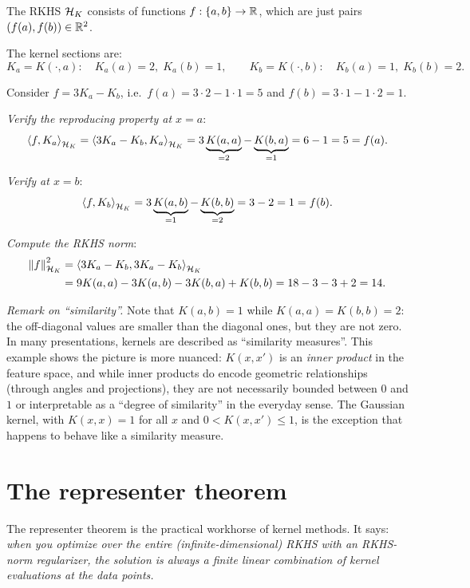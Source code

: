 \begin{notechapter}
\begin{example}
The RKHS $\mathcal{H}_K$ consists of functions $f: \{a,b\} \to \mathbb{R}$, which are just
pairs $(f(a), f(b)) \in \mathbb{R}^2$.

The kernel sections are:
\[
K_a = K(\cdot, a): \quad K_a(a) = 2,\; K_a(b) = 1, \qquad K_b = K(\cdot,
b): \quad K_b(a) = 1,\; K_b(b) = 2.
\]

Consider $f = 3K_a - K_b$, i.e.\ $f(a) = 3 \cdot 2 - 1 \cdot 1 = 5$ and
$f(b) = 3 \cdot 1 - 1 \cdot 2 = 1$.

\emph{Verify the reproducing property at $x = a$}:
\[
\left\langle f, K_a \right\rangle_{\mathcal{H}_K} = \left\langle 3K_a - K_b, K_a \right\rangle_{\mathcal{H}_K} =
3\underbrace{K(a,a)}_{=2} - \underbrace{K(b,a)}_{=1} = 6 - 1 = 5 = f(a).
\]

\emph{Verify at $x = b$}:
\[
\left\langle f, K_b \right\rangle_{\mathcal{H}_K} = 3\underbrace{K(a,b)}_{=1} -
\underbrace{K(b,b)}_{=2} = 3 - 2 = 1 = f(b).
\]

\emph{Compute the RKHS norm}:
\[
\begin{aligned}
\left\|f\right\|_{\mathcal{H}_K}^2 &= \left\langle 3K_a - K_b, 3K_a - K_b \right\rangle_{\mathcal{H}_K}\\ &= 9K(a,a) -
3K(a,b) - 3K(b,a) + K(b,b) = 18 - 3 - 3 + 2 = 14.
\end{aligned}
\]

\emph{Remark on ``similarity''.}
Note that $K(a,b) = 1$ while $K(a,a) = K(b,b) = 2$:
the off-diagonal values are smaller than the diagonal
ones, but they are not zero. In many presentations,
kernels are described as ``similarity measures''.
This example shows the picture is more nuanced:
$K(x,x')$ is an \emph{inner product} in the feature
space, and while inner products do encode geometric
relationships (through angles and projections), they
are not necessarily bounded between $0$ and $1$ or
interpretable as a ``degree of similarity'' in the
everyday sense. The Gaussian kernel, with
$K(x,x) = 1$ for all $x$ and
$0 < K(x,x') \leq 1$, is the exception that
happens to behave like a similarity measure.
\end{example}


\section{The representer theorem}
\label{rkhs:sec:representer}

The representer theorem is the practical workhorse of kernel methods. It
says: \emph{when you optimize over the entire (infinite-dimensional)
RKHS with an RKHS-norm regularizer, the solution is always a finite
linear combination of kernel evaluations at the data points.}


\end{notechapter}
